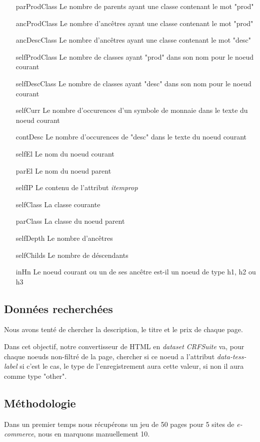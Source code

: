 \documentclass{article}
\begin{document}
\begin{itemize}
    \item[parProdClass] Le nombre de parents ayant une classe contenant le mot "prod"
    \item[ancProdClass] Le nombre d'ancêtres ayant une classe contenant le mot "prod"
    \item[ancDescClass] Le nombre d'ancêtres ayant une classe contenant le mot "desc"
    \item[selfProdClass] Le nombre de classes ayant "prod" dans son nom pour le noeud courant
    \item[selfDescClass] Le nombre de classes ayant "desc" dans son nom pour le noeud courant
    \item[selfCurr] Le nombre d'occurences d'un symbole de monnaie dans le texte du noeud courant
    \item[contDesc] Le nombre d'occurences de "desc" dans le texte du noeud courant
    \item[selfEl] Le nom du noeud courant
    \item[parEl] Le nom du noeud parent
    \item[selfIP] Le contenu de l'attribut \emph{itemprop}
    \item[selfClass] La classe courante
    \item[parClass] La classe du noeud parent
    \item[selfDepth] Le nombre d'ancêtres
    \item[selfChilds] Le nombre de déscendants
    \item[inHn] Le noeud courant ou un de ses ancêtre est-il un noeud de type h1, h2 ou h3
\end{itemize}

\subsection{Données recherchées}
Nous avons tenté de chercher la description, le titre et le prix de chaque page.

Dans cet objectif, notre convertisseur de HTML en \emph{dataset CRFSuite} va, pour chaque
noeuds non-filtré de la page, chercher si ce noeud a l'attribut \emph{data-tess-label}
si c'est le cas, le type de l'enregistrement aura cette valeur, si non il aura comme
type "other".

\subsection{Méthodologie}
Dans un premier temps nous récupérons un jeu de 50 pages pour 5 sites de \emph{e-commerce},
nous en marquons manuellement 10.
\end{document}
